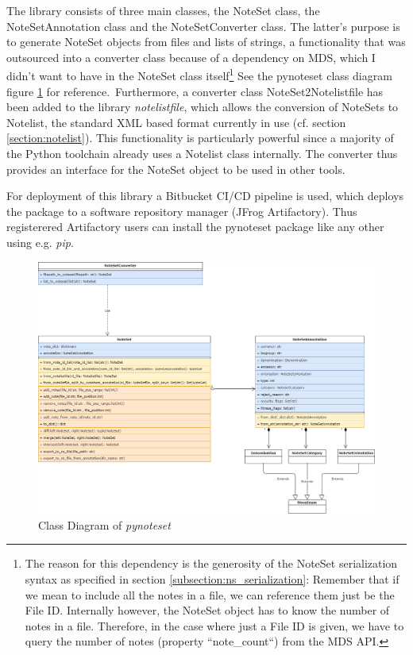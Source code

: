 The library consists of three main classes, the NoteSet class, the NoteSetAnnotation class and the NoteSetConverter class. The latter's purpose is to generate NoteSet objects from files and lists of strings, a functionality that was outsourced into a converter class because of a dependency on MDS, which I didn't want to have in the NoteSet class itself\footnote{The reason for this dependency is the generosity of the NoteSet serialization syntax as specified in section \ref{subsection:ns_serialization}: Remember that if we mean to include all the notes in a file, we can reference them just be the File ID. Internally however, the NoteSet object has to know the number of notes in a file. Therefore, in the case where just a File ID is given, we have to query the number of notes (property ``note\_count``) from the MDS API.} See the pynoteset class diagram figure \ref{fig:pynoteset} for reference.\
Furthermore, a converter class NoteSet2Notelistfile has been added to the library \emph{notelistfile}, which allows the conversion of NoteSets to Notelist, the standard XML based format currently in use (cf. section \ref{section:notelist}). This functionality is particularly powerful since a majority of the Python toolchain already uses a Notelist class internally. The converter thus provides an interface for the NoteSet object to be used in other tools.\par
For deployment of this library a Bitbucket CI/CD pipeline is used, which deploys the package to a software repository manager (JFrog Artifactory). Thus registerered Artifactory users can install the pynoteset package like any other using e.g. \emph{pip}.
\begin{figure}
 \includegraphics[width=\linewidth]{images/pynoteset.png}
   \caption{Class Diagram of \emph{pynoteset}}\label{fig:pynoteset}
\end{figure}

